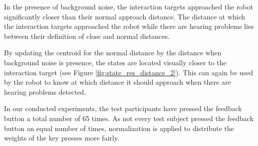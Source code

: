 \documentclass[a4paper,11pt]{report}
\begin{document}
In the presence of background noise, the interaction targets approached the robot significantly closer than their normal approach distance.
The distance at which the interaction targets approached the robot while there are hearing problems lies between their definition of close and normal distances. 

By updating the centroid for the normal distance by the distance when background noise is presence, the states are located visually closer to the interaction target (see Figure \ref{fig:state_res_distance_2}). This can again be used by the robot to know at which distance it should approach when there are hearing problems detected.

In our conducted experiments, the test participants have pressed the feedback button a total number of 65 times. %
As not every test subject pressed the feedback button an equal number of times, normalization is applied to distribute the weights of the key presses more fairly.
\end{document}
